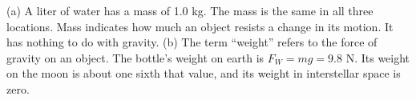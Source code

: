 (a) A liter of water has a mass of 1.0 kg. The mass is
the same in all three locations. Mass indicates how much an
object resists a change in its motion. It has nothing to do
with gravity. (b) The term ``weight'' refers to the force of
gravity on an object. The bottle's weight on earth is
$F_W=mg=9.8$ N. Its weight on the moon is about one
sixth that value, and its weight in interstellar space is zero.



